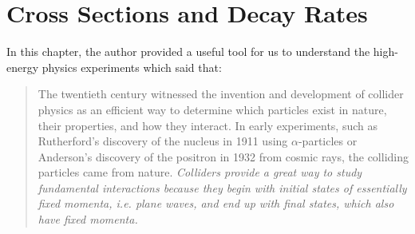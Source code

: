 \documentclass[12pt,openany]{book}
\begin{document}
	\chapter{Cross Sections and Decay Rates}
	In this chapter, the author provided a useful tool for us to understand the high-energy physics experiments which said that:
	\begin{quotation}
			The twentieth century witnessed the invention and development of collider physics as an efficient way to determine which particles exist in nature, their properties, and how they interact. In early experiments, such as Rutherford's discovery of the nucleus in 1911 using $\alpha$-particles or Anderson's discovery of the positron in 1932 from cosmic rays, the colliding particles came from nature. \textit{Colliders provide a great way to study fundamental interactions because they begin with initial states of essentially fixed momenta, i.e. plane waves, and end up with final states, which also have fixed momenta.}
	\end{quotation}
\end{document}
